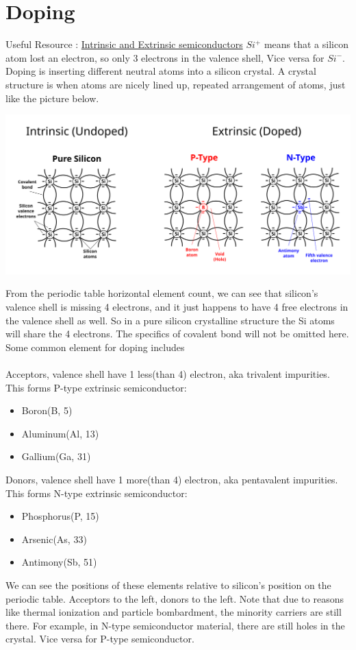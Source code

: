 \documentclass{article}
\begin{document}
	\section{Doping}
		Useful Resource : \href{https://www.youtube.com/watch?v=ErcH_OuCaNY&list=PLfYdTiQCV_p7sDswtLZKK43BWOd2mTmHC&index=3&ab_channel=CircuitBread}{Intrinsic and Extrinsic semiconductors}
	 	$Si^+$ means that a silicon atom lost an electron, so only 3 electrons in the valence shell, Vice versa for $Si^{-}$.\\
	 	Doping is inserting different neutral atoms into a silicon crystal. A crystal structure is when atoms are nicely lined up, repeated arrangement of atoms, just like the picture below.
	 	\begin{center}
	 		\includegraphics[width=\textwidth]{img/si_doping.png}
	 	\end{center}
	 	From the periodic table horizontal element count, we can see that silicon's valence shell is missing 4 electrons, and it just happens to have 4 free electrons in the valence shell as well. So in a pure silicon crystalline structure the Si atoms will share the 4 electrons. The specifics of covalent bond will not be omitted here. Some common element for doping includes\\\\
	 	Acceptors, valence shell have 1 less(than 4) electron, aka trivalent impurities. This forms P-type extrinsic semiconductor:
	 	\begin{itemize}
	 		\item Boron(B, 5)
	 		\item Aluminum(Al, 13)
	 		\item Gallium(Ga, 31)
	 	\end{itemize}
	 	Donors, valence shell have 1 more(than 4) electron, aka pentavalent impurities. This forms N-type extrinsic semiconductor:
	 	\begin{itemize}
	 		\item Phosphorus(P, 15)
	 		\item Arsenic(As, 33)
	 		\item Antimony(Sb, 51)
	 	\end{itemize}
	 	We can see the positions of these elements relative to silicon's position on the periodic table. Acceptors to the left, donors to the left. Note that due to reasons like thermal ionization and particle bombardment, the minority carriers are still there. For example, in N-type semiconductor material, there are still holes in the crystal. Vice versa for P-type semiconductor.
\end{document}
